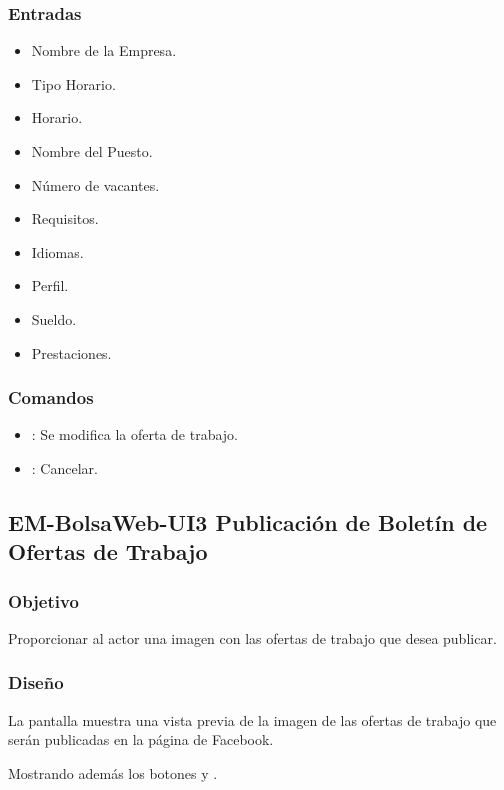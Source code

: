 \subsubsection{Entradas}
	\begin{itemize}
		\item Nombre de la Empresa.
		\item Tipo Horario.
		\item Horario.
		\item Nombre del Puesto.
		\item Número de vacantes.
		\item Requisitos.
		\item Idiomas.
		\item Perfil.
		\item Sueldo.
		\item Prestaciones. 
	\end{itemize}

\subsubsection{Comandos}
\begin{itemize}
	\item {}: Se modifica la oferta de trabajo.  
	\item {}: Cancelar.  
\end{itemize}

\subsection{EM-BolsaWeb-UI3 Publicación de Boletín de Ofertas de Trabajo}

\subsubsection{Objetivo}
	\noindent
	Proporcionar al actor una imagen con las ofertas de trabajo que desea publicar.
\subsubsection{Diseño}
	\noindent
	La pantalla muestra una vista previa de la imagen de las ofertas de trabajo que serán publicadas en la página de Facebook.

	Mostrando además los botones  y .

